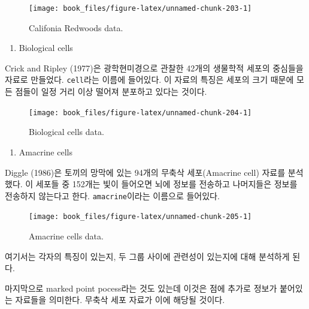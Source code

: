 \documentclass[b5paper,]{scrbook}
\providecommand{\tightlist}{%
  \setlength{\itemsep}{0pt}\setlength{\parskip}{0pt}}
\theoremstyle{plain}
\theoremstyle{definition}
\numberwithin{equation}{section}
\begin{document}
\begin{figure}

{\centering \texttt{[image: book\_files/figure-latex/unnamed-chunk-203-1]} 

}

\caption{Califonia Redwoods data.}\label{fig:unnamed-chunk-203}
\end{figure}

\begin{enumerate}
\def\labelenumi{\arabic{enumi}.}
\setcounter{enumi}{2}
\tightlist
\item
  Biological cells
\end{enumerate}

Crick and Ripley (1977)은 광학현미경으로 관찰한 42개의 생물학적 세포의
중심들을 자료로 만들었다. \texttt{cell}라는 이름에 들어있다. 이 자료의
특징은 세포의 크기 때문에 모든 점들이 일정 거리 이상 떨어져 분포하고
있다는 것이다.

\begin{figure}

{\centering \texttt{[image: book\_files/figure-latex/unnamed-chunk-204-1]} 

}

\caption{Biological cells data.}\label{fig:unnamed-chunk-204}
\end{figure}

\begin{enumerate}
\def\labelenumi{\arabic{enumi}.}
\setcounter{enumi}{3}
\tightlist
\item
  Amacrine cells
\end{enumerate}

Diggle (1986)은 토끼의 망막에 있는 94개의 무축삭 세포(Amacrine cell)
자료를 분석했다. 이 세포들 중 152개는 빛이 들어오면 뇌에 정보를 전송하고
나머지들은 정보를 전송하지 않는다고 한다. \texttt{amacrine}이라는
이름으로 들어있다.

\begin{figure}

{\centering \texttt{[image: book\_files/figure-latex/unnamed-chunk-205-1]} 

}

\caption{Amacrine cells data.}\label{fig:unnamed-chunk-205}
\end{figure}

여기서는 각자의 특징이 있는지, 두 그룹 사이에 관련성이 있는지에 대해
분석하게 된다.

마지막으로 marked point pocess라는 것도 있는데 이것은 점에 추가로 정보가
붙어있는 자료들을 의미한다. 무축삭 세포 자료가 이에 해당될 것이다.
\end{document}
